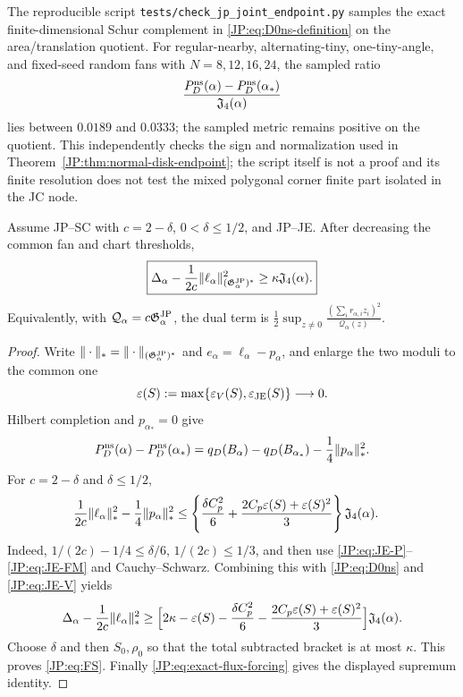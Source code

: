\begin{remark}
The reproducible script
\texttt{tests/check\_jp\_joint\_endpoint.py} samples the exact
finite-dimensional Schur complement in \eqref{JP:eq:D0ns-definition} on the
area/translation quotient.  For regular-nearby, alternating-tiny,
one-tiny-angle, and fixed-seed random fans with
$N=8,12,16,24$, the sampled ratio
\[
 \frac{P_D^{\rm ns}(\alpha)-P_D^{\rm ns}(\alpha_*)}
      {\mathfrak J_4(\alpha)}
\]
lies between $0.0189$ and $0.0333$; the sampled metric remains positive on
the quotient.  This independently checks the sign and normalization used
in Theorem~\ref{JP:thm:normal-disk-endpoint}; the script itself is not a proof
and its finite resolution does not test the mixed polygonal corner finite
part isolated in the JC node.
\end{remark}

\begin{proposition}
\label{JP:prop:FS}
Assume JP--SC with $c=2-\delta$, $0<\delta\le1/2$, and JP--JE.  After
decreasing the common fan and chart thresholds,
\begin{equation}\label{JP:eq:FS}
 \boxed{
 \Delta_\alpha
 -\frac1{2c}\|\ell_\alpha\|_{(\mathfrak G^{\rm JP}_\alpha)^*}^2
 \ge\kappa\mathfrak J_4(\alpha).}
\end{equation}
Equivalently, with $\mathcal Q_\alpha=c\mathfrak G^{\rm JP}_\alpha$, the dual term is
\(
 \frac12\sup_{z\ne0}\frac{(\sum_i r_{\alpha,i}z_i)^2}
 {\mathcal Q_\alpha(z)}
\).
\end{proposition}

\begin{proof}
Write $\|\cdot\|_* =\|\cdot\|_{(\mathfrak G^{\rm JP}_\alpha)^*}$ and
$e_\alpha=\ell_\alpha-p_\alpha$, and enlarge the two moduli to the common
one
\[
 \varepsilon(S):=\max\{\varepsilon_V(S),
                         \varepsilon_{\rm JE}(S)\}\longrightarrow0.
\]
Hilbert completion and
$p_{\alpha_*}=0$ give
\[
 P_D^{\rm ns}(\alpha)-P_D^{\rm ns}(\alpha_*)
 =q_D(B_\alpha)-q_D(B_{\alpha_*})
  -\frac14\|p_\alpha\|_*^2.
\]
For $c=2-\delta$ and $\delta\le1/2$,
\begin{align*}
 \frac1{2c}\|\ell_\alpha\|_*^2-\frac14\|p_\alpha\|_*^2
 &\le\left\{
 \frac{\delta C_p^2}{6}
 +\frac{2C_p\varepsilon(S)
        +\varepsilon(S)^2}{3}\right\}\mathfrak J_4(\alpha).
\end{align*}
Indeed,
$1/(2c)-1/4\le\delta/6$, $1/(2c)\le1/3$, and then use
\eqref{JP:eq:JE-P}--\eqref{JP:eq:JE-FM} and Cauchy--Schwarz.  Combining this
with \eqref{JP:eq:D0ns} and \eqref{JP:eq:JE-V} yields
\begin{align*}
 \Delta_\alpha-\frac1{2c}\|\ell_\alpha\|_*^2
 \ge\Bigl[2\kappa-\varepsilon(S)
 -\frac{\delta C_p^2}{6}
 -\frac{2C_p\varepsilon(S)
        +\varepsilon(S)^2}{3}\Bigr]\mathfrak J_4(\alpha).
\end{align*}
Choose $\delta$ and then $S_0,\rho_0$ so that the total subtracted bracket
is at most $\kappa$.  This proves \eqref{JP:eq:FS}.  Finally
\eqref{JP:eq:exact-flux-forcing} gives the displayed supremum identity.
\end{proof}

